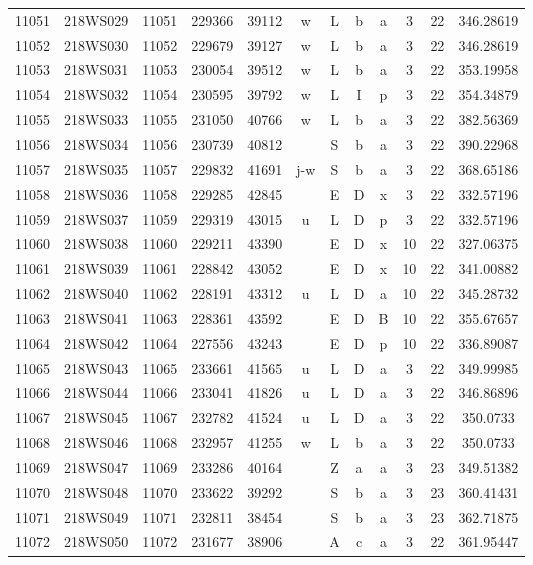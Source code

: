 \begin{tabular}{|*{12}{c|}}
11051 & 218WS029 & 11051 & 229366 & 39112 & w & L & b & a & 3 & 22 & 346.28619 \\ 
11052 & 218WS030 & 11052 & 229679 & 39127 & w & L & b & a & 3 & 22 & 346.28619 \\ 
11053 & 218WS031 & 11053 & 230054 & 39512 & w & L & b & a & 3 & 22 & 353.19958 \\ 
11054 & 218WS032 & 11054 & 230595 & 39792 & w & L & I & p & 3 & 22 & 354.34879 \\ 
11055 & 218WS033 & 11055 & 231050 & 40766 & w & L & b & a & 3 & 22 & 382.56369 \\ 
11056 & 218WS034 & 11056 & 230739 & 40812 &  & S & b & a & 3 & 22 & 390.22968 \\ 
11057 & 218WS035 & 11057 & 229832 & 41691 & j-w & S & b & a & 3 & 22 & 368.65186 \\ 
11058 & 218WS036 & 11058 & 229285 & 42845 &  & E & D & x & 3 & 22 & 332.57196 \\ 
11059 & 218WS037 & 11059 & 229319 & 43015 & u & L & D & p & 3 & 22 & 332.57196 \\ 
11060 & 218WS038 & 11060 & 229211 & 43390 &  & E & D & x & 10 & 22 & 327.06375 \\ 
11061 & 218WS039 & 11061 & 228842 & 43052 &  & E & D & x & 10 & 22 & 341.00882 \\ 
11062 & 218WS040 & 11062 & 228191 & 43312 & u & L & D & a & 10 & 22 & 345.28732 \\ 
11063 & 218WS041 & 11063 & 228361 & 43592 &  & E & D & B & 10 & 22 & 355.67657 \\ 
11064 & 218WS042 & 11064 & 227556 & 43243 &  & E & D & p & 10 & 22 & 336.89087 \\ 
11065 & 218WS043 & 11065 & 233661 & 41565 & u & L & D & a & 3 & 22 & 349.99985 \\ 
11066 & 218WS044 & 11066 & 233041 & 41826 & u & L & D & a & 3 & 22 & 346.86896 \\ 
11067 & 218WS045 & 11067 & 232782 & 41524 & u & L & D & a & 3 & 22 & 350.0733 \\ 
11068 & 218WS046 & 11068 & 232957 & 41255 & w & L & b & a & 3 & 22 & 350.0733 \\ 
11069 & 218WS047 & 11069 & 233286 & 40164 &  & Z & a & a & 3 & 23 & 349.51382 \\ 
11070 & 218WS048 & 11070 & 233622 & 39292 &  & S & b & a & 3 & 23 & 360.41431 \\ 
11071 & 218WS049 & 11071 & 232811 & 38454 &  & S & b & a & 3 & 23 & 362.71875 \\ 
11072 & 218WS050 & 11072 & 231677 & 38906 &  & A & c & a & 3 & 22 & 361.95447 \\ 

\end{tabular}
